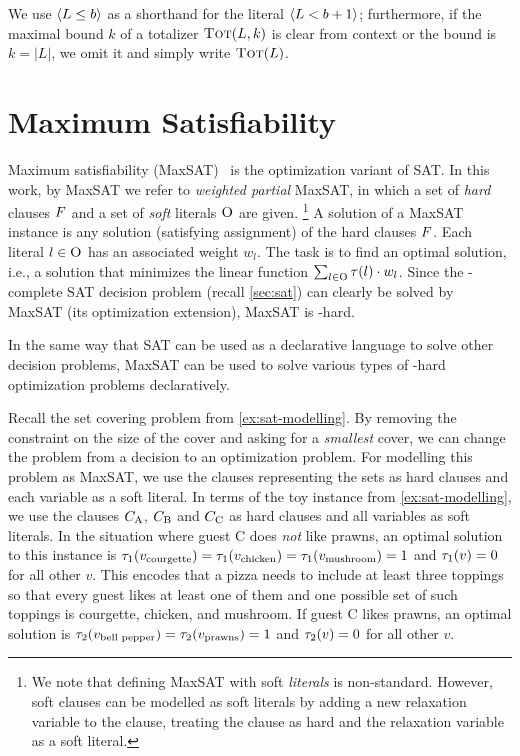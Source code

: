 We use $\langle L \leq b \rangle$ as a shorthand for the literal $\langle L < b+1 \rangle$;
furthermore, if the maximal bound $k$ of a totalizer $\textsc{Tot}(L,k)$ is clear from context or the bound is $k=|L|$, we omit it and simply write $\textsc{Tot}(L)$.

\section{Maximum Satisfiability\label{sec:max-sat}}

Maximum satisfiability (MaxSAT)~\autocite{handbook2-maxsat} is the optimization variant of SAT.
In this work, by MaxSAT we refer to \emph{weighted partial} MaxSAT, in which a set of \emph{hard} clauses $F$ and a set of \emph{soft} literals $\textsc{O}$ are given.%
\footnote{We note that defining MaxSAT with soft \emph{literals} is non-standard. However, soft clauses can be modelled as soft literals by adding a new relaxation variable to the clause, treating the clause as hard and the relaxation variable as a soft literal.}
A solution of a MaxSAT instance is any solution (satisfying assignment) of the hard clauses $F$.
Each literal $l \in \textsc{O}$ has an associated weight $w_l$.
The task is to find an optimal solution, i.e., a solution that minimizes the linear function $\sum_{l\in \textsc{O}}\tau(l)\cdot w_l$.
Since the \NP-complete SAT decision problem (recall \cref{sec:sat}) can clearly be solved by MaxSAT (its optimization extension), MaxSAT is \NP-hard.

In the same way that SAT can be used as a declarative language to solve other decision problems, MaxSAT can be used to solve various types of \NP-hard optimization problems declaratively.

\begin{example}\label{ex:maxsat-modelling}
  Recall the set covering problem from \cref{ex:sat-modelling}.
  By removing the constraint on the size of the cover and asking for a \emph{smallest} cover, we can change the problem from a decision to an optimization problem.
  For modelling this problem as MaxSAT, we use the clauses representing the sets as hard clauses and each variable as a soft literal.
  In terms of the toy instance from \cref{ex:sat-modelling}, we use the clauses $C_\text{A}$, $C_\text{B}$ and $C_\text{C}$ as hard clauses and all variables as soft literals.
  In the situation where guest C does \emph{not} like prawns, an optimal solution to this instance is $\tau_1(v_\text{courgette}) = \tau_1(v_\text{chicken}) = \tau_1(v_\text{mushroom}) = 1$ and $\tau_1(v) = 0$ for all other $v$.
  This encodes that a pizza needs to include at least three toppings so that every guest likes at least one of them and one possible set of such toppings is courgette, chicken, and mushroom.
  If guest C likes prawns, an optimal solution is $\tau_2(v_\text{bell pepper}) = \tau_2(v_\text{prawns}) = 1$ and $\tau_2(v) = 0$ for all other $v$.
\end{example}

